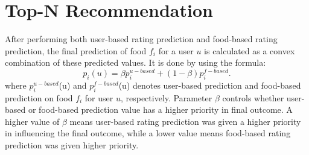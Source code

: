 \section{Top-N Recommendation}
After performing both user-based rating prediction and food-based rating prediction, the final prediction of food $f_i$ for a user $u$ is calculated as a convex combination of these predicted values\cite*{9775081, oulu_tdlgc}. It is done by using the formula:
\begin{equation*}
    p_{i}\left({u}\right)=\beta p_{i}^{u-based}+\left({1-\beta }\right) p_{i}^{f-based}. \tag{7}
\end{equation*}
where $p_i^{u-based}$(u) and $p_i^{f-based}$(u) denotes user-based prediction and food-based prediction on food $f_i$ for user $u$, respectively\cite*{9775081, oulu_tdlgc}. Parameter $\beta$ controls whether user-based or food-based prediction value has a higher priority in final outcome. A higher value of $\beta$ means user-based rating prediction was given a higher priority in influencing the final outcome, while a lower value means food-based rating prediction was given higher priority.